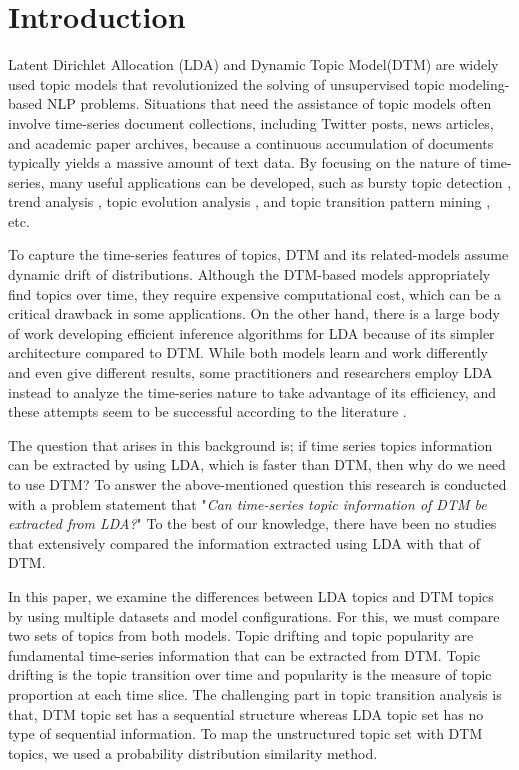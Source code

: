 \chapter{Introduction}
Latent Dirichlet Allocation (LDA) \cite{blei2003latent} and Dynamic Topic Model(DTM) \cite{blei2006dynamic} are widely used topic models that revolutionized the solving of unsupervised topic modeling-based NLP problems.
Situations that need the assistance of topic models often involve time-series document collections, including Twitter posts, news articles, and academic paper archives, because a continuous accumulation of documents typically yields a massive amount of text data.
By focusing on the nature of time-series, many useful applications can be developed, such as bursty topic detection \cite{koike2013time}, trend analysis \cite{kawamae2011trend,zhang2015market,khan2019events}, topic evolution analysis \cite{blei2006dynamic,kalyanam2015context,xie2016topicsketch,amoualian2016streaming,acharya2018dmdtm}, and topic transition pattern mining \cite{kim2015toptrak}, etc.

To capture the time-series features of topics, DTM and its related-models \cite{amoualian2016streaming,acharya2018dmdtm} assume dynamic drift of distributions.
Although the DTM-based models appropriately find topics over time, they require expensive computational cost, which can be a critical drawback in some applications.
On the other hand, there is a large body of work developing efficient inference algorithms for LDA because of its simpler architecture compared to DTM.
While both models learn and work differently and even give different results, some practitioners and researchers employ LDA instead to analyze the time-series nature to take advantage of its efficiency, and these attempts seem to be successful according to the literature \cite{khan2019events}.

The question that arises in this background is; if time series topics information can be extracted by using LDA, which is faster than DTM, then why do we need to use DTM?
To answer the above-mentioned question this research is conducted with a problem statement that "\emph{Can time-series topic information of DTM be extracted from LDA?}"
To the best of our knowledge, there have been no studies that extensively compared the information extracted using LDA with that of DTM.

In this paper, we examine the differences between LDA topics and DTM topics by using multiple datasets and model configurations.
For this, we must compare two sets of topics from both models. Topic drifting and topic popularity are fundamental time-series information that can be extracted from DTM. Topic drifting is the topic transition over time and popularity is the measure of topic proportion at each time slice. The challenging part in topic transition analysis is that, DTM topic set has a sequential structure whereas LDA topic set has no type of sequential information. To map the unstructured topic set with DTM topics, we used a probability distribution similarity method.

